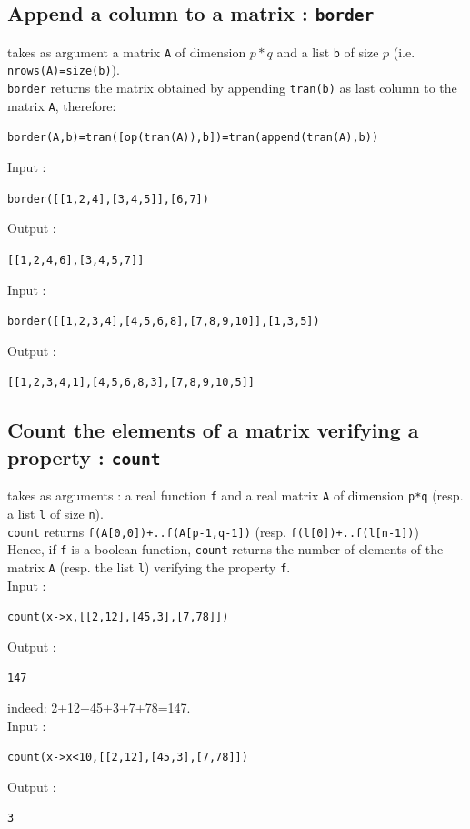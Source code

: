 \documentclass[a4paper,11pt]{book}
\begin{document}
\subsection{Append a column to a matrix : {\tt border}}
 takes as argument a matrix {\tt A} of dimension $p*q$
 and a list {\tt b} of size $p$ (i.e. {\tt nrows(A)=size(b)}).\\
{\tt border} returns the matrix obtained by appending 
{\tt tran(b)} as last column to the matrix {\tt A}, therefore:
\begin{center}
{\tt border(A,b)=tran([op(tran(A)),b])=tran(append(tran(A),b))}
\end{center}
Input :
\begin{center}{\tt border([[1,2,4],[3,4,5]],[6,7])}\end{center}
Output :
\begin{center}{\tt  [[1,2,4,6],[3,4,5,7]]}\end{center}
Input :
\begin{center}{\tt border([[1,2,3,4],[4,5,6,8],[7,8,9,10]],[1,3,5])}\end{center}
Output :
\begin{center}{\tt  [[1,2,3,4,1],[4,5,6,8,3],[7,8,9,10,5]]}\end{center}

\subsection{Count the elements of a matrix verifying a property : {\tt count}}
 takes as arguments : a real function {\tt f} and 
a real matrix {\tt A} of dimension {\tt p*q} (resp. a list {\tt l} of size 
{\tt n}).\\
{\tt count} returns {\tt f(A[0,0])+..f(A[p-1,q-1])} (resp.  
{\tt f(l[0])+..f(l[n-1])})\\
Hence, if {\tt f} is a boolean function, {\tt count} returns the number 
of elements of the matrix {\tt A} (resp. the  list {\tt l}) verifying 
the property {\tt f}.\\
Input :
\begin{center}{\tt count(x->x,[[2,12],[45,3],[7,78]])}\end{center}
Output :
\begin{center}{\tt  147}\end{center}
indeed: 2+12+45+3+7+78=147.\\
Input :
\begin{center}{\tt count(x->x<10,[[2,12],[45,3],[7,78]])}\end{center}
Output :
\begin{center}{\tt  3}\end{center}
\end{document}
